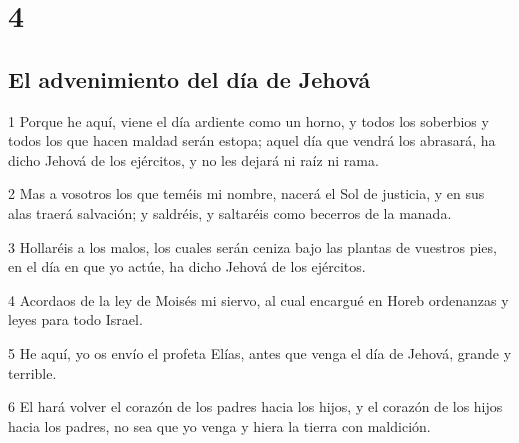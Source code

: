 \chapter{4}

\section*{El advenimiento del día de Jehová}

\par 1 Porque he aquí, viene el día ardiente como un horno, y todos los soberbios y todos los que hacen maldad serán estopa; aquel día que vendrá los abrasará, ha dicho Jehová de los ejércitos, y no les dejará ni raíz ni rama.
\par 2 Mas a vosotros los que teméis mi nombre, nacerá el Sol de justicia, y en sus alas traerá salvación; y saldréis, y saltaréis como becerros de la manada.
\par 3 Hollaréis a los malos, los cuales serán ceniza bajo las plantas de vuestros pies, en el día en que yo actúe, ha dicho Jehová de los ejércitos. 
\par 4 Acordaos de la ley de Moisés mi siervo, al cual encargué en Horeb ordenanzas y leyes para todo Israel.
\par 5 He aquí, yo os envío el profeta Elías, antes que venga el día de Jehová, grande y terrible.
\par 6 El hará volver el corazón de los padres hacia los hijos, y el corazón de los hijos hacia los padres, no sea que yo venga y hiera la tierra con maldición.

